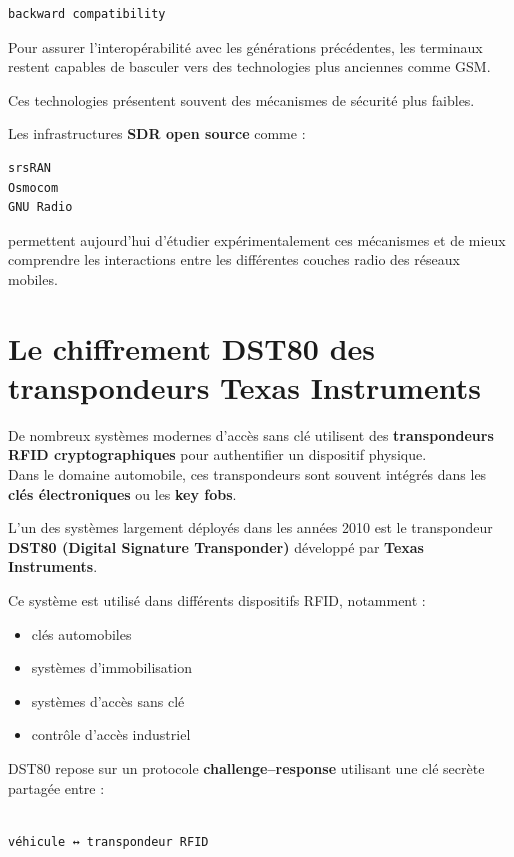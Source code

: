 \documentclass[
  french,
]{article}
\providecommand{\tightlist}{%
  \setlength{\itemsep}{0pt}\setlength{\parskip}{0pt}}
\begin{document}
\begin{verbatim}
backward compatibility
\end{verbatim}

Pour assurer l'interopérabilité avec les générations précédentes, les
terminaux restent capables de basculer vers des technologies plus
anciennes comme GSM.

Ces technologies présentent souvent des mécanismes de sécurité plus
faibles.

Les infrastructures \textbf{SDR open source} comme :

\begin{verbatim}
srsRAN
Osmocom
GNU Radio
\end{verbatim}

permettent aujourd'hui d'étudier expérimentalement ces mécanismes et de
mieux comprendre les interactions entre les différentes couches radio
des réseaux mobiles.

\section{Le chiffrement DST80 des transpondeurs Texas
Instruments}\label{le-chiffrement-dst80-des-transpondeurs-texas-instruments}

De nombreux systèmes modernes d'accès sans clé utilisent des
\textbf{transpondeurs RFID cryptographiques} pour authentifier un
dispositif physique.\\
Dans le domaine automobile, ces transpondeurs sont souvent intégrés dans
les \textbf{clés électroniques} ou les \textbf{key fobs}.

L'un des systèmes largement déployés dans les années 2010 est le
transpondeur \textbf{DST80 (Digital Signature Transponder)} développé
par \textbf{Texas Instruments}.

Ce système est utilisé dans différents dispositifs RFID, notamment :

\begin{itemize}
\tightlist
\item
  clés automobiles
\item
  systèmes d'immobilisation
\item
  systèmes d'accès sans clé
\item
  contrôle d'accès industriel
\end{itemize}

DST80 repose sur un protocole \textbf{challenge--response} utilisant une
clé secrète partagée entre :

\begin{verbatim}

véhicule ↔ transpondeur RFID
\end{verbatim}
\end{document}
